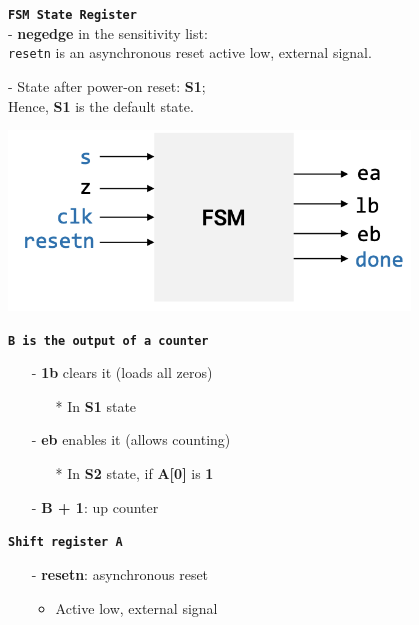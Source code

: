 \documentclass[12pt,openany]{book}
\begin{document}
\begin{minipage}[htp]{0.45\textwidth}
\begin{justify}
	\texttt{\textbf{FSM State Register }}\\
	- \textbf{negedge} in the sensitivity list: \\
	\texttt{resetn} is an asynchronous reset active low, external signal.

	- State after power-on reset: \textbf{S1}; \\
	Hence, \textbf{S1} is the default state.
	\begin{center}
		\includegraphics[width=0.8\textwidth]{circuits/18.4_3.png}
	\end{center}
\end{justify}
\begin{justify}
	\texttt{\textbf{B is the output of a counter}}
	\begin{itemize}
		\item[-] \textbf{1b} clears it (loads all zeros)
		\begin{itemize}
			\item[*] In \textbf{S1} state
		\end{itemize}
		\item[-] \textbf{eb} enables it (allows counting)
		\begin{itemize}
			\item[*] In \textbf{S2} state, if \textbf{A[0]} is \textbf{1}
		\end{itemize}
		\item[-] \textbf{B + 1}: up counter
	\end{itemize}
\end{justify}
\begin{justify}
	\texttt{\textbf{Shift register \textbf{A}}}
   \begin{itemize}
	   \item[-] \textbf{resetn}: asynchronous reset
	   \begin{itemize}
		   \item Active low, external signal
	   \end{itemize}

\end{itemize}
\end{justify}
\end{minipage}
\end{document}
